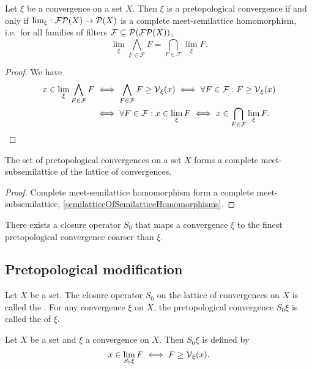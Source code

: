 \begin{proposition}
Let $\xi$ be a convergence on a set $X$. Then $\xi$ is a pretopological convergence \textup{if and only if} $\lim_\xi: \operatorname{\mathcal{FP}}(X)\to \operatorname{\mathcal{P}}(X)$ is a complete meet-semilattice homomorphism, i.e.\
for all families of filters $\mathcal{F} \subseteq \operatorname{\mathcal{P}}(\operatorname{\mathcal{FP}}(X))$,
\[ \lim_\xi \bigwedge_{F\in \mathcal{F}}F = \bigcap_{F\in\mathcal{F}}\lim_\xi F. \] 
\end{proposition}
\begin{proof}
We have
\begin{align*}
x\in \lim_\xi \bigwedge_{F\in \mathcal{F}}F &\iff \bigwedge_{F\in \mathcal{F}}F \geq \operatorname{\mathcal{V}}_\xi(x) \iff \forall F\in\mathcal{F}: F\geq \operatorname{\mathcal{V}}_\xi(x) \\
&\iff \forall F\in \mathcal{F}: x\in\lim_\xi F \iff x\in \bigcap_{F\in\mathcal{F}}\lim_\xi F.
\end{align*}
\end{proof}
\begin{corollary}
The set of pretopological convergences on a set $X$ forms a complete meet-subsemilattice of the lattice of convergences.
\end{corollary}
\begin{proof}
Complete meet-semilattice homomorphism form a complete meet-subsemilattice, \ref{semilatticeOfSemilatticeHomomorphisms}.
\end{proof}
\begin{corollary}
There exists a closure operator $S_0$ that maps a convergence $\xi$ to the finest pretopological convergence coarser than $\xi$.
\end{corollary}

\subsection{Pretopological modification}
\begin{definition}
Let $X$ be a set. The closure operator $S_0$ on the lattice of convergences on $X$ is called the . For any convergence $\xi$ on $X$, the pretopological convergence $S_0\xi$ is called the  of $\xi$.
\end{definition}

\begin{proposition}
Let $X$ be a set and $\xi$ a convergence on $X$. Then $S_0\xi$ is defined by
\[ x\in \lim_{S_0\xi} F \iff F \geq \operatorname{\mathcal{V}}_\xi(x). \]
\end{proposition}


